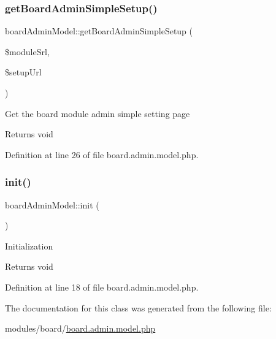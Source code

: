 \subsubsection{\texorpdfstring{get\+Board\+Admin\+Simple\+Setup()}{getBoardAdminSimpleSetup()}}
{\footnotesize\ttfamily board\+Admin\+Model\+::get\+Board\+Admin\+Simple\+Setup (\begin{DoxyParamCaption}\item[{}]{\$module\+Srl,  }\item[{}]{\$setup\+Url }\end{DoxyParamCaption})}

Get the board module admin simple setting page \begin{DoxyReturn}{Returns}
void 
\end{DoxyReturn}


Definition at line 26 of file board.\+admin.\+model.\+php.

\hypertarget{classboardAdminModel_a93e03d7310fcdba8892e43de7fb532d0}{}\label{classboardAdminModel_a93e03d7310fcdba8892e43de7fb532d0} 
\subsubsection{\texorpdfstring{init()}{init()}}
{\footnotesize\ttfamily board\+Admin\+Model\+::init (\begin{DoxyParamCaption}{ }\end{DoxyParamCaption})}

Initialization \begin{DoxyReturn}{Returns}
void 
\end{DoxyReturn}


Definition at line 18 of file board.\+admin.\+model.\+php.



The documentation for this class was generated from the following file\+:\begin{DoxyCompactItemize}
\item 
modules/board/\hyperlink{board_8admin_8model_8php}{board.\+admin.\+model.\+php}\end{DoxyCompactItemize}
